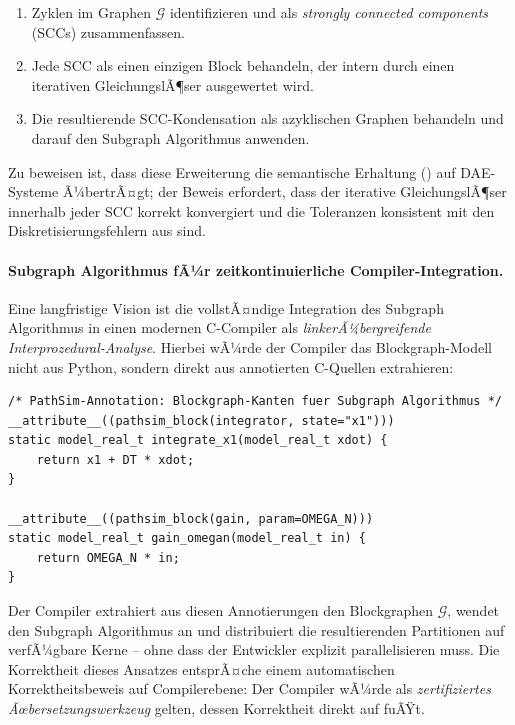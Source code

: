 ﻿\documentclass[12pt,a4paper]{article}
\theoremstyle{definition}
\begin{document}
\begin{enumerate}[label=(\roman*), nosep]
  \item Zyklen im Graphen $\mathcal{G}$ identifizieren und als
        \emph{strongly connected components} (SCCs) zusammenfassen.
  \item Jede SCC als einen einzigen Block behandeln, der intern
        durch einen iterativen GleichungslÃ¶ser ausgewertet wird.
  \item Die resultierende SCC-Kondensation als azyklischen Graphen
        behandeln und darauf den Subgraph Algorithmus anwenden.
\end{enumerate}

Zu beweisen ist, dass diese Erweiterung die semantische Erhaltung
() auf DAE-Systeme Ã¼bertrÃ¤gt; der Beweis
erfordert, dass der iterative GleichungslÃ¶ser innerhalb jeder SCC
korrekt konvergiert und die Toleranzen konsistent mit den
Diskretisierungsfehlern aus  sind.

\paragraph{Subgraph Algorithmus fÃ¼r zeitkontinuierliche Compiler-Integration.}
Eine langfristige Vision ist die vollstÃ¤ndige Integration des
Subgraph Algorithmus in einen modernen C-Compiler als
\emph{linkerÃ¼bergreifende Interprozedural-Analyse}. Hierbei
wÃ¼rde der Compiler das Blockgraph-Modell nicht aus Python,
sondern direkt aus annotierten C-Quellen extrahieren:

\begin{lstlisting}[style=cstyle, caption={Annotiertes C-Format fÃ¼r den Subgraph Algorithmus}]
/* PathSim-Annotation: Blockgraph-Kanten fuer Subgraph Algorithmus */
__attribute__((pathsim_block(integrator, state="x1")))
static model_real_t integrate_x1(model_real_t xdot) {
    return x1 + DT * xdot;
}

__attribute__((pathsim_block(gain, param=OMEGA_N)))
static model_real_t gain_omegan(model_real_t in) {
    return OMEGA_N * in;
}
\end{lstlisting}

Der Compiler extrahiert aus diesen Annotierungen den Blockgraphen
$\mathcal{G}$, wendet den Subgraph Algorithmus an und distribuiert
die resultierenden Partitionen auf verfÃ¼gbare Kerne -- ohne dass der
Entwickler explizit parallelisieren muss. Die Korrektheit dieses
Ansatzes entsprÃ¤che einem automatischen Korrektheitsbeweis auf
Compilerebene: Der Compiler wÃ¼rde als \emph{zertifiziertes
Ãœbersetzungswerkzeug} gelten, dessen Korrektheit direkt auf
 fuÃŸt.
\end{document}
